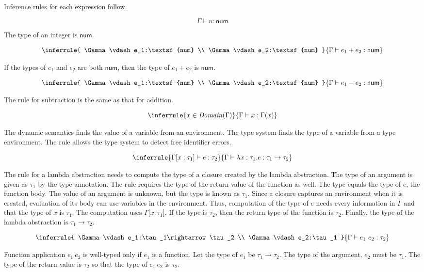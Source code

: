 Inference rules for each expression follow.

\[
\Gamma\vdash n:\textsf{num}
\]

The type of an integer is $\textsf{num}$.

\[
\inferrule
{ \Gamma\vdash e_1:\textsf{num} \\ \Gamma\vdash e_2:\textsf{num} }
{ \Gamma\vdash e_1+e_2:\textsf{num} }
\]

If the types of $e_1$ and $e_2$ are both $\textsf{num}$, then the type of
$e_1+e_2$ is $\textsf{num}$.

\[
\inferrule
{ \Gamma\vdash e_1:\textsf{num} \\ \Gamma\vdash e_2:\textsf{num} }
{ \Gamma\vdash e_1-e_2:\textsf{num} }
\]

The rule for subtraction is the same as that for addition.

\[
\inferrule
{ x\in\mathit{Domain}(\Gamma) }
{ \Gamma\vdash x:\Gamma(x)}
\]

The dynamic semantics finds the value of a variable from an environment. The type
system finds the type of a variable from a type environment. The rule allows the
type system to detect free identifier errors.

\[
\inferrule
{ \Gamma\lbrack x:\tau_1\rbrack\vdash e:\tau_2 }
{ \Gamma\vdash \lambda x:\tau_1.e:\tau_1\rightarrow\tau_2 }
\]

The rule for a lambda abstraction needs to compute the type of a closure created
by the lambda abstraction. The type of an argument is given as $\tau_1$ by the
type annotation. The rule requires the type of the return value of the function
as well. The type equals the type of $e$, the function body. The value of an
argument is unknown, but the type is known as $\tau_1$. Since a closure captures
an environment when it is created, evaluation of its body can use variables in
the environment. Thus, computation of the type of $e$ needs every information in
$\Gamma$ and that the type of $x$ is $\tau_1$. The computation uses
$\Gamma\lbrack x:\tau_1\rbrack$. If the type is $\tau_2$, then the return type of
the function is $\tau_2$. Finally, the type of the lambda abstraction is
$\tau_1\rightarrow\tau_2$.

\[
\inferrule
{ \Gamma\vdash e_1:\tau_1\rightarrow\tau_2 \\
  \Gamma\vdash e_2:\tau_1 }
{ \Gamma\vdash e_1\ e_2:\tau_2 }
\]

Function application $e_1\ e_2$ is well-typed only if $e_1$ is a function. Let
the type of $e_1$ be $\tau_1\rightarrow\tau_2$. The type of the argument, $e_2$
must be $\tau_1$. The type of the return value is $\tau_2$ so that the type of
$e_1\ e_2$ is $\tau_2$.


